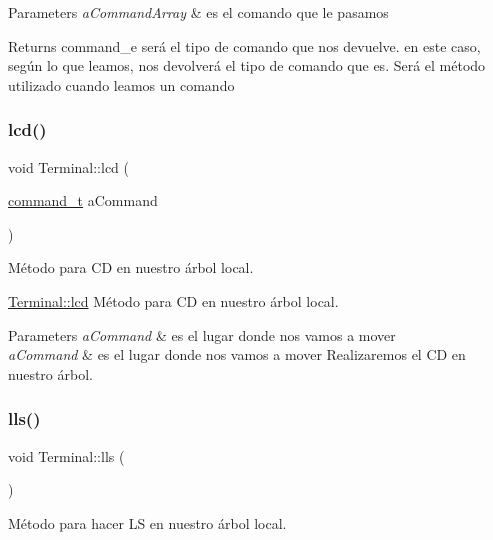 \begin{DoxyParams}{Parameters}
{\em a\+Command\+Array} & es el comando que le pasamos \\
\hline
\end{DoxyParams}
\begin{DoxyReturn}{Returns}
command\+\_\+e será el tipo de comando que nos devuelve. en este caso, según lo que leamos, nos devolverá el tipo de comando que es. Será el método utilizado cuando leamos un comando 
\end{DoxyReturn}
\mbox{\label{classTerminal_a185d7b22ac6e3fc5bd55b711926e8089}} 
\subsubsection{\texorpdfstring{lcd()}{lcd()}}
{\footnotesize\ttfamily void Terminal\+::lcd (\begin{DoxyParamCaption}\item[{\hyperlink{structcommand__t}{command\+\_\+t}}]{a\+Command }\end{DoxyParamCaption})}



Método para CD en nuestro árbol local. 

\hyperlink{classTerminal_a185d7b22ac6e3fc5bd55b711926e8089}{Terminal\+::lcd} Método para CD en nuestro árbol local.


\begin{DoxyParams}{Parameters}
{\em a\+Command} & es el lugar donde nos vamos a mover\\
\hline
{\em a\+Command} & es el lugar donde nos vamos a mover Realizaremos el CD en nuestro árbol. \\
\hline
\end{DoxyParams}
\mbox{\label{classTerminal_a5a72cb107514fb7c5f4d345c3da4a064}} 
\subsubsection{\texorpdfstring{lls()}{lls()}}
{\footnotesize\ttfamily void Terminal\+::lls (\begin{DoxyParamCaption}{ }\end{DoxyParamCaption})}



Método para hacer LS en nuestro árbol local. 

